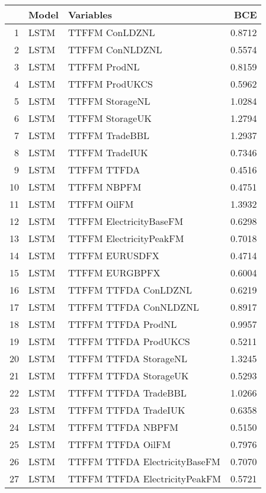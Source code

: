 \begin{table}[ht]
\centering
\begin{tabular}{rllr}
  \hline
 & Model & Variables & BCE \\ 
  \hline
1 & LSTM & TTFFM ConLDZNL & 0.8712 \\ 
  2 & LSTM & TTFFM ConNLDZNL & 0.5574 \\ 
  3 & LSTM & TTFFM ProdNL & 0.8159 \\ 
  4 & LSTM & TTFFM ProdUKCS & 0.5962 \\ 
  5 & LSTM & TTFFM StorageNL & 1.0284 \\ 
  6 & LSTM & TTFFM StorageUK & 1.2794 \\ 
  7 & LSTM & TTFFM TradeBBL & 1.2937 \\ 
  8 & LSTM & TTFFM TradeIUK & 0.7346 \\ 
  9 & LSTM & TTFFM TTFDA & 0.4516 \\ 
  10 & LSTM & TTFFM NBPFM & 0.4751 \\ 
  11 & LSTM & TTFFM OilFM & 1.3932 \\ 
  12 & LSTM & TTFFM ElectricityBaseFM & 0.6298 \\ 
  13 & LSTM & TTFFM ElectricityPeakFM & 0.7018 \\ 
  14 & LSTM & TTFFM EURUSDFX & 0.4714 \\ 
  15 & LSTM & TTFFM EURGBPFX & 0.6004 \\ 
  16 & LSTM & TTFFM TTFDA ConLDZNL & 0.6219 \\ 
  17 & LSTM & TTFFM TTFDA ConNLDZNL & 0.8917 \\ 
  18 & LSTM & TTFFM TTFDA ProdNL & 0.9957 \\ 
  19 & LSTM & TTFFM TTFDA ProdUKCS & 0.5211 \\ 
  20 & LSTM & TTFFM TTFDA StorageNL & 1.3245 \\ 
  21 & LSTM & TTFFM TTFDA StorageUK & 0.5293 \\ 
  22 & LSTM & TTFFM TTFDA TradeBBL & 1.0266 \\ 
  23 & LSTM & TTFFM TTFDA TradeIUK & 0.6358 \\ 
  24 & LSTM & TTFFM TTFDA NBPFM & 0.5150 \\ 
  25 & LSTM & TTFFM TTFDA OilFM & 0.7976 \\ 
  26 & LSTM & TTFFM TTFDA ElectricityBaseFM & 0.7070 \\ 
  27 & LSTM & TTFFM TTFDA ElectricityPeakFM & 0.5721 \\ 

\end{tabular}
\end{table}
